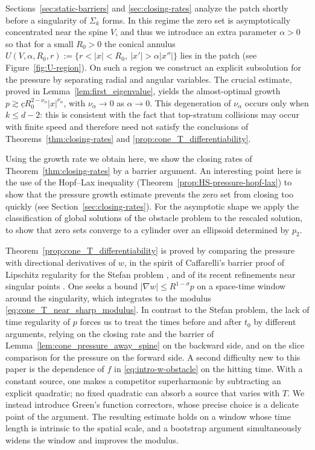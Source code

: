 \documentclass[11pt]{amsart}
\numberwithin{equation}{section}
\numberwithin{figure}{section}
\theoremstyle{plain}
\theoremstyle{definition}
\theoremstyle{remark}
\theoremstyle{plain}
\newcommand{\abs}[1]{\lvert #1 \rvert}
\begin{document}
Sections~\ref{sec:static-barriers} and
\ref{sec:closing-rates} analyze the patch shortly before a singularity of $\Sigma_k$ forms.
In this regime the zero set is asymptotically concentrated near
the spine $V$, and thus we introduce an extra parameter $\alpha>0$ so that for a small $R_0>0$ the conical annulus
$U(V,\alpha,R_0,r):=\{r<\abs{x}<R_0,\ \abs{x'}>\alpha\abs{x''}\}$ lies in the patch
(see Figure~\ref{fig:U-region}). On such a region we construct an explicit subsolution for the pressure by
separating radial and angular variables.
The crucial estimate, proved in Lemma~\ref{lem:first_eigenvalue}, 
yields the almost-optimal growth $p\gtrsim\underline cR_0^{2-\nu_\alpha}\abs{x}^{\nu_\alpha}$, with $\nu_{\alpha}\to 0$ as $\alpha\to 0$.
This degeneration of $\nu_{\alpha}$ occurs only when $k\leq d-2$: this is consistent with the fact that top-stratum
collisions may occur with finite speed and therefore need not satisfy the conclusions of
Theorems~\ref{thm:closing-rates} and \ref{prop:cone_T_differentiability}.


Using the growth rate we obtain here, we show the closing rates of Theorem~\ref{thm:closing-rates} by a barrier argument.
An interesting point here is the use of the Hopf--Lax inequality (Theorem~\ref{prop:HS-pressure-hopf-lax}) to show that the pressure growth estimate prevents the zero set from closing too quickly
(see
Section~\ref{sec:closing-rates}).
For the asymptotic shape we
apply
the classification of global solutions of the obstacle problem
\cite{FriedmanSakai1986,EFW25} to the rescaled solution, to show that zero sets converge to a cylinder
over an ellipsoid determined by $p_2$.



Theorem~\ref{prop:cone_T_differentiability} is proved by comparing the pressure with directional
derivatives of $w$, in the spirit of Caffarelli's barrier proof of Lipschitz regularity for
the Stefan problem \cite{caffarelli1978}, and of its recent refinements near singular points
\cite{EKM25,FRT26}. One seeks a bound $\abs{\nabla w}\leq R^{1-\sigma}p$ on a
space-time window around the singularity, which integrates to the modulus
\eqref{eq:cone_T_near_sharp_modulus}. In contrast to the Stefan problem, the lack of time regularity of $p$ forces us to treat
the times before and after $t_0$ by different arguments, relying on the closing rate and the
barrier of Lemma~\ref{lem:cone_pressure_away_spine} on the backward side, and on the slice
comparison for the pressure on the forward side. A second difficulty new to this paper is
the dependence of $f$ in \eqref{eq:intro-w-obstacle} on the hitting time.
With a constant source, one makes a competitor superharmonic by subtracting an
explicit quadratic; no fixed quadratic can absorb a source that varies with $T$. We
instead introduce Green's function correctors, whose precise choice is a delicate point of
the argument. The resulting
estimate holds on a window whose time length is intrinsic to the spatial scale, and a
bootstrap argument simultaneously widens the window and improves the modulus.
\end{document}
